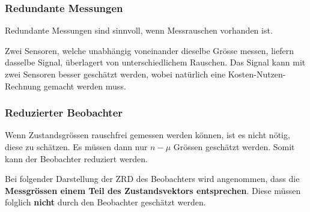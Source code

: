 \subsubsection{Redundante Messungen}

Redundante Messungen sind sinnvoll, wenn Messrauschen vorhanden ist.

\smallskip

Zwei Sensoren, welche unabhängig voneinander dieselbe Grösse messen, liefern dasselbe Signal, überlagert von unterschiedlichem Rauschen.
Das Signal kann mit zwei Sensoren besser geschätzt werden, wobei natürlich eine Kosten-Nutzen-Rechnung gemacht werden muss.



\subsubsection{Reduzierter Beobachter}

Wenn Zustandsgrössen rauschfrei gemessen werden können, ist es nicht nötig, diese zu schätzen. 
Es müssen dann nur $n - \mu$ Grössen geschätzt werden. Somit kann der Beobachter reduziert werden.

\smallskip

Bei folgender Darstellung der ZRD des Beobachters wird angenommen, dass die \textbf{Messgrössen einem Teil des Zustandsvektors entsprechen}.
Diese müssen folglich \textbf{nicht} durch den Beobachter geschätzt werden.

\vspace{-0.1cm}

